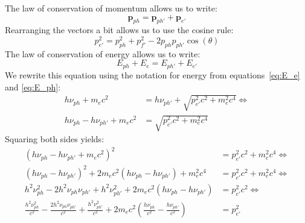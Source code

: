 The law of conservation of momentum allows us to write:
\begin{equation}
\textbf{p}_{ph} = \textbf{p}_{ph'} + \textbf{p}_{e'}
\end{equation}
Rearranging the vectors a bit allows us to use the cosine rule:
\begin{equation}
p^2_{e'} = p^2_{ph} + p^2_{f'} - 2p_{ph}p_{ph'}\cos(\theta) \label{eq:en_final}
\end{equation}
The law of conservation of energy allows us to write:
\begin{equation}
E_{ph} +E_e = E_{ph'} + E_{e'}
\end{equation}
We rewrite this equation using the notation for energy from equations~\ref{eq:E_e} and \ref{eq:E_ph}:
\begin{align}
h \nu_{ph} + m_e c^2 &= h \nu_{ph'} + \sqrt{p^2_{e'}c^2 + m^2_e c^4} \Longleftrightarrow\\
h \nu_{ph} - h \nu_{ph'} + m_e c^2 &= \sqrt{p^2_{e'}c^2 + m^2_e c^4}
\end{align}
Squaring both sides yields:
\begin{align}
\left( h \nu_{ph} - h \nu_{ph'} + m_e c^2 \right)^2 &= p^2_{e'}c^2 + m^2_e c^4 \Longleftrightarrow\\
\left( h \nu_{ph} - h \nu_{ph'} \right)^2 + 2m_e c^2 \left( h \nu_{ph} - h \nu_{ph'}\right) + m^2_e c^4 &= p^2_{e'}c^2 + m^2_e c^4 \Longleftrightarrow\\
h^2\nu^2_{ph} - 2h^2\nu_{ph}\nu_{ph'} + h^2\nu^2_{ph'} + 2m_ec^2 \left( h\nu_{ph} - h\nu_{ph'} \right) &= p^2_{e'}c^2 \Longleftrightarrow\\
\frac{h^2\nu^2_{ph}}{c^2} - \frac{2h^2\nu_{ph}\nu_{ph'}}{c^2} + \frac{h^2\nu^2_{ph'}}{c^2}+ 2m_ec^2 \left(  \frac{h\nu_{ph}}{c^2} - \frac{h\nu_{ph'}}{c^2} \right) &= p^2_{e'} \label{eq:mom_final}
\end{align}

